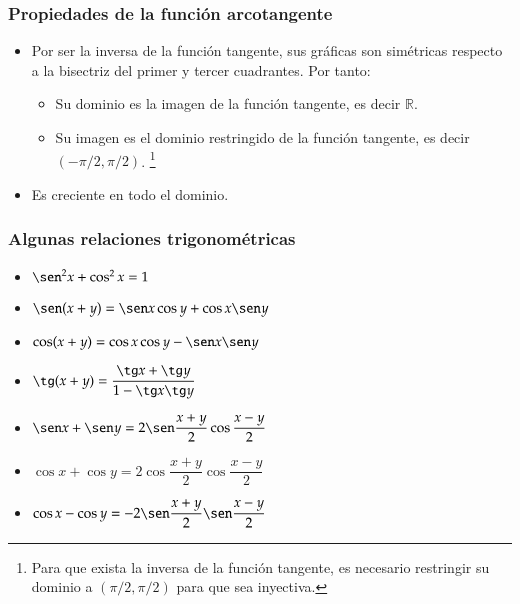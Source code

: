 		
		\begin{frame}
			\frametitle{Propiedades de la función arcotangente}
			\begin{itemize}
				\item Por ser la inversa de la función tangente, sus gráficas son simétricas respecto a la bisectriz del primer y tercer
				      cuadrantes. Por tanto:
				      \begin{itemize}
				      	\item Su dominio es la imagen de la función tangente, es decir $\mathbb{R}$.
				      	\item Su imagen es el dominio restringido de la función tangente, es decir $(-\pi/2,\pi/2)$.
				      	      \footnote{Para que exista la inversa de la función tangente, es necesario restringir su dominio a $(\pi/2,\pi/2)$ para que sea inyectiva.}
				      \end{itemize}
				\item Es creciente en todo el dominio.
			\end{itemize}
		\end{frame} 
		
		
		\begin{frame}
			\frametitle{Algunas relaciones trigonométricas}
			\begin{itemize}
				\item $\sen^2 x+\cos^2 x=1$
				\item $\sen(x+y)=\sen x \cos y+\cos x \sen y$
				\item $\cos(x+y)=\cos x \cos y-\sen x \sen y$
				\item $\tg (x+y)= \dfrac{\tg x+\tg y}{1-\tg x \tg y}$
				\item $\sen x + \sen y = 2 \sen \dfrac{x+y}{2}\cos\dfrac{x-y}{2}$
				\item $\cos x + \cos y = 2 \cos \dfrac{x+y}{2}\cos\dfrac{x-y}{2}$
				\item $\cos x - \cos y = -2 \sen \dfrac{x+y}{2}\sen\dfrac{x-y}{2}$
			\end{itemize}
		\end{frame} 